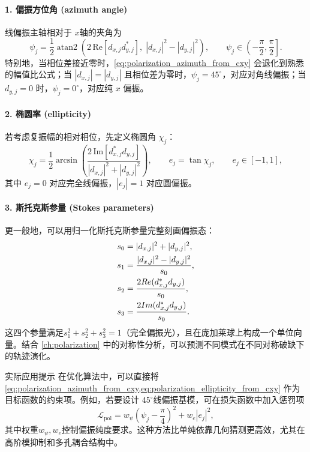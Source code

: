\paragraph{1. 偏振方位角 (azimuth angle)}
线偏振主轴相对于 $x$轴的夹角为
\begin{equation}
\psi_j
=
\frac{1}{2}\operatorname{atan2}\!\left(
2\,\mathrm{Re}\!\left[d_{x,j}d_{y,j}^{\ast}\right],\;
|d_{x,j}|^2-|d_{y,j}|^2
\right),
\qquad
\psi_j \in \left(-\frac{\pi}{2},\frac{\pi}{2}\right].
\label{eq:polarization_azimuth_from_cxy}
\end{equation}
特别地，当相位差接近零时，\cref{eq:polarization_azimuth_from_cxy} 会退化到熟悉的幅值比公式；当 $|d_{x,j}|=|d_{y,j}|$ 且相位差为零时，$\psi_j=45^\circ$，对应对角线偏振；当 $d_{y,j}=0$ 时，$\psi_j=0^\circ$，对应纯 $x$ 偏振。

\paragraph{2. 椭圆率 (ellipticity)}
若考虑复振幅的相对相位，先定义椭圆角 $\chi_j$：
\begin{equation}
\chi_j
=
\frac{1}{2}\arcsin\!\left(
\frac{2\,\mathrm{Im}\!\left[d_{x,j}^{\ast}d_{y,j}\right]}{|d_{x,j}|^2 + |d_{y,j}|^2}
\right),
\qquad
e_j = \tan\chi_j,
\qquad
e_j \in [-1, 1],
\label{eq:polarization_ellipticity_from_cxy}
\end{equation}
其中 $e_j=0$ 对应完全线偏振，$|e_j|=1$ 对应圆偏振。

\paragraph{3. 斯托克斯参量 (Stokes parameters)}
更一般地，可以用归一化斯托克斯参量完整刻画偏振态：
\begin{align}
s_0 &= |d_{x,j}|^2 + |d_{y,j}|^2, \notag\\
s_1 &= \frac{|d_{x,j}|^2 - |d_{y,j}|^2}{s_0}, \notag\\
s_2 &= \frac{2\mathrm{Re}(d_{x,j}^* d_{y,j})}{s_0}, \notag\\
s_3 &= \frac{2\mathrm{Im}(d_{x,j}^* d_{y,j})}{s_0}.
\label{eq:stokes_from_cxy_chapter9}
\end{align}
这四个参量满足$s_1^2+s_2^2+s_3^2=1$（完全偏振光），且在庞加莱球上构成一个单位向量。结合 \cref{ch:polarization} 中的对称性分析，可以预测不同模式在不同对称破缺下的轨迹演化。

\begin{NoteBox}[breakable]{实际应用提示}
在优化算法中，可以直接将 \cref{eq:polarization_azimuth_from_cxy,eq:polarization_ellipticity_from_cxy} 作为目标函数的约束项。例如，若要设计 $45^\circ$线偏振基模，可在损失函数中加入惩罚项
\begin{equation}
\mathcal{L}_{\mathrm{pol}} = w_{\psi}\left(\psi_j - \frac{\pi}{4}\right)^2 + w_e |e_j|^2,
\end{equation}
其中权重$w_\psi,w_e$控制偏振纯度要求。这种方法比单纯依靠几何猜测更高效，尤其在高阶模抑制和多孔耦合结构中。
\end{NoteBox}


